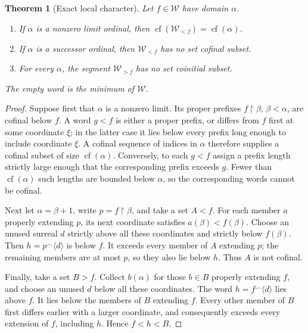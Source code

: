 \documentclass[11pt]{article}
\newtheorem{theorem}{Theorem}[section]
\theoremstyle{definition}
\theoremstyle{remark}
\newcommand{\cf}{\operatorname{cf}}
\newcommand{\cat}{\mathbin{{}^\frown}}
\begin{document}
\begin{theorem}[Exact local character]\label{swo:sw:character}
Let \(f\in\mathcal W\) have domain \(\alpha\).
\begin{enumerate}
\item If \(\alpha\) is a nonzero limit ordinal, then
      \(\cf(\mathcal W_{<f})=\cf(\alpha)\).
\item If \(\alpha\) is a successor ordinal, then
      \(\mathcal W_{<f}\) has no set cofinal subset.
\item For every \(\alpha\), the segment
      \(\mathcal W_{>f}\) has no set coinitial subset.
\end{enumerate}
The empty word is the minimum of \(\mathcal W\).
\end{theorem}

\begin{proof}
Suppose first that \(\alpha\) is a nonzero limit.
Its proper prefixes \(f\restriction\beta\), \(\beta<\alpha\),
are cofinal below \(f\).  A word \(g<f\) is either a proper
prefix, or differs from \(f\) first at some coordinate \(\xi\);
in the latter case it lies below every prefix long enough to
include coordinate \(\xi\).  A cofinal sequence of indices
in \(\alpha\) therefore supplies a cofinal subset of size
\(\cf(\alpha)\).
Conversely, to each \(g<f\) assign a prefix length strictly
large enough that the corresponding prefix exceeds \(g\).
Fewer than \(\cf(\alpha)\) such lengths are bounded below
\(\alpha\), so the corresponding words cannot be cofinal.

Next let \(\alpha=\beta+1\), write \(p=f\restriction\beta\),
and take a set \(A<f\).  For each member \(a\) properly
extending \(p\), its next coordinate satisfies
\(a(\beta)<f(\beta)\).  Choose an unused surreal \(d\)
strictly above all these coordinates and strictly below
\(f(\beta)\).
Then \(h=p\cat\langle d\rangle\) is below \(f\).
It exceeds every member of \(A\) extending \(p\);
the remaining members are at most \(p\), so they also lie
below \(h\).  Thus \(A\) is not cofinal.

Finally, take a set \(B>f\).
Collect \(b(\alpha)\) for those \(b\in B\) properly extending
\(f\), and choose an unused \(d\) below all these coordinates.
The word \(h=f\cat\langle d\rangle\) lies above \(f\).
It lies below the members of \(B\) extending \(f\).
Every other member of \(B\) first differs earlier with a
larger coordinate, and consequently exceeds every extension
of \(f\), including \(h\).  Hence \(f<h<B\).
\end{proof}
\end{document}
